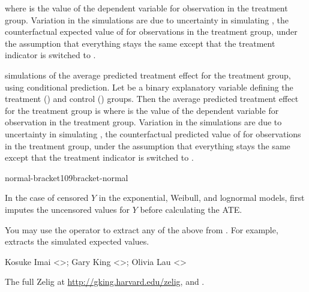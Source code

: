 \begin{Value}
\begin{ldescription}
where  is the value of the dependent variable for
observation  in the treatment group.  Variation in the
simulations are due to uncertainty in simulating ,
the counterfactual expected value of  for observations in the
treatment group, under the assumption that everything stays the
same except that the treatment indicator is switched to . 
\item[\code{qi\$ate.pr}] simulations of the average predicted
treatment effect for the treatment group, using conditional
prediction. Let  be a binary explanatory variable defining
the treatment () and control () groups.  Then the
average predicted treatment effect for the treatment group is
where  is the value of the dependent variable for
observation  in the treatment group.  Variation in the
simulations are due to uncertainty in simulating
, the counterfactual predicted value of
 for observations in the treatment group, under the
assumption that everything stays the same except that the
treatment indicator is switched to . 
\end{ldescription}

normal-bracket109bracket-normal

In the case of censored $Y$ in the exponential, Weibull, and lognormal
models,  first imputes the uncensored values for $Y$ before
calculating the ATE.  

You may use the \code{\$} operator to extract any of the
above from .  For example,  extracts the
simulated expected values.
\end{Value}
\begin{Author}\relax
Kosuke Imai <>; Gary King
<>; Olivia Lau <>
\end{Author}
\begin{SeeAlso}\relax
The full Zelig at \url{http://gking.harvard.edu/zelig}, and .
\end{SeeAlso}


